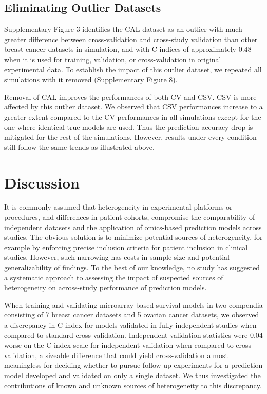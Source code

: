 \documentclass{bioinfo}
\begin{document}
  \subsection{Eliminating Outlier Datasets}
  Supplementary Figure 3 identifies the CAL dataset as an outlier with
  much greater difference between cross-validation and cross-study
  validation than other breast cancer datasets in simulation, and with C-indices of
  approximately 0.48 when it is used for training, validation, or
  cross-validation in original experimental data.  To establish the
  impact of this outlier dataset, we repeated all simulations with it
  removed (Supplementary Figure 8). %

  Removal of CAL improves the performances of both CV and CSV. CSV is more affected by this outlier dataset. We observed that CSV performances increase to a greater extent compared to the CV performances in all simulations except for the one where identical true models are used. Thus the
  prediction accuracy drop is mitigated for the rest of the simulations. However, results under 
  every condition still follow the same trends as illustrated above.
  
\section{Discussion}

It is commonly assumed that heterogeneity in experimental platforms or
procedures, and differences in patient cohorts, compromise the
comparability of independent datasets and the application of
omics-based prediction models across studies.  The obvious solution is
to minimize potential sources of heterogeneity, for example by
enforcing precise inclusion criteria for patient inclusion in clinical
studies.  However, such narrowing has costs in sample size and
potential generalizability of findings.  To the best of our knowledge,
no study has suggested a systematic approach to assessing the impact
of suspected sources of heterogeneity on across-study performance of
prediction models.

When training and validating microarray-based survival models in two 
compendia consisting of 7 breast cancer datasets and 5 ovarian cancer datasets,  
we observed a discrepancy in C-index for models validated in fully
independent studies when compared to standard cross-validation.
Independent validation statistics were 0.04 worse on the
C-index scale for independent validation when compared to
cross-validation, a sizeable difference that could yield
cross-validation almost meaningless for deciding whether to pursue
follow-up experiments for a prediction model developed and validated
on only a single dataset. We thus investigated the contributions of
known and unknown sources of heterogeneity to this discrepancy.
\end{document}
